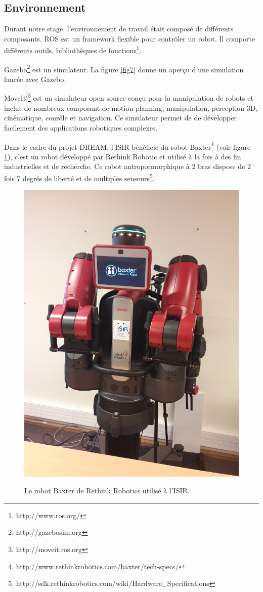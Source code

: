 \documentclass{llncs}
\begin{document}




\subsection{Environnement}
 
Durant notre stage, l'environnement de travail était composé de différents composants. ROS est un framework flexible pour contrôler un robot. Il comporte différents outils, bibliothèques de fonctions\footnote{http://www.ros.org/}.

Gazebo\footnote{http://gazebosim.org} est un simulateur. La figure \ref{fig7} donne un aperçu d'une simulation lancée avec Gazebo.

MoveIt!\footnote{http://moveit.ros.org} est un simulateur open source conçu pour la manipulation de robots et inclut de nombreux composant de motion planning, manipulation, perception 3D, cinématique, conrôle et navigation. Ce simulateur permet de de développer facilement des applications robotiques complexes.

Dans le cadre du projet DREAM, l'ISIR bénéficie du robot Baxter\footnote{http://www.rethinkrobotics.com/baxter/tech-specs/} (voir figure \ref{fig:baxter}), c'est un robot développé par Rethink Robotic et utilisé à la fois à des fin industrielles et de recherche. Ce robot antropormorphique à 2 bras dispose de 2 fois 7 degrés de liberté et de multiples senseurs\footnote{http://sdk.rethinkrobotics.com/wiki/Hardware\_Specifications}.

\begin{figure}
	\centering
	\includegraphics[angle=-90,width=.4\textwidth]{figures/baxter}
	\label{fig:baxter}
	\caption{Le robot Baxter de Rethink Robotics utilisé à l'ISIR.}
\end{figure}
\end{document}
